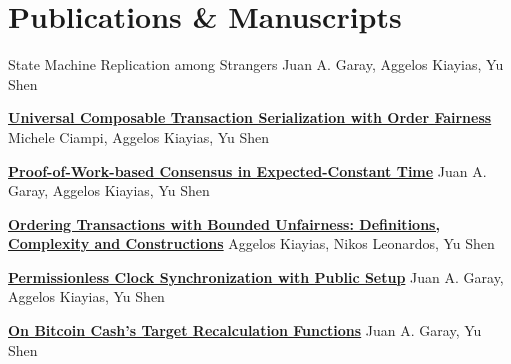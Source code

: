 \section{Publications \& Manuscripts}

{State Machine Replication among Strangers}
{}
{}
{}
{\normalsize Juan A. Garay, Aggelos Kiayias, Yu Shen}

{\textbf{\href{https://eprint.iacr.org/2024/1296.pdf}{Universal Composable Transaction Serialization with Order Fairness}}}
{}
{}
{}
{\normalsize Michele Ciampi, Aggelos Kiayias, Yu Shen}

{\textbf{\href{https://eprint.iacr.org/2023/1663.pdf}{Proof-of-Work-based Consensus in Expected-Constant Time}}}
{}
{}
{}
{\normalsize Juan A. Garay, Aggelos Kiayias, Yu Shen}

{\textbf{\href{https://eprint.iacr.org/2023/1253.pdf}{Ordering Transactions with Bounded Unfairness: Definitions, Complexity and Constructions}}}
{}
{}
{}
{\normalsize Aggelos Kiayias, Nikos Leonardos, Yu Shen}

{\textbf{\href{https://eprint.iacr.org/2022/1220.pdf}{Permissionless Clock Synchronization with Public Setup}}}
{}
{}
{}
{\normalsize Juan A. Garay, Aggelos Kiayias, Yu Shen}

{\textbf{\href{https://eprint.iacr.org/2021/143.pdf}{On Bitcoin Cash's Target Recalculation Functions}}}
{}
{}
{}
{\normalsize Juan A. Garay, Yu Shen}